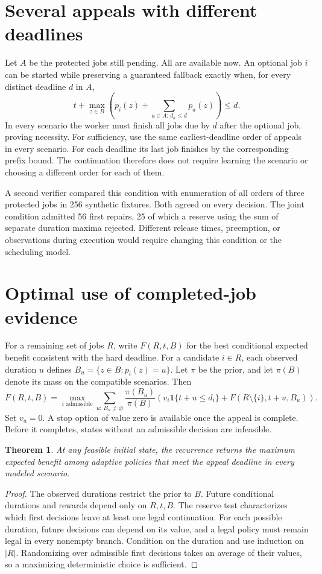 \documentclass[11pt]{article}
\newtheorem{theorem}{Theorem}
\begin{document}
\section{Several appeals with different deadlines}
Let $A$ be the protected jobs still pending. All are available now.
An optional job $i$ can be started while preserving a guaranteed
fallback exactly when, for every distinct deadline $d$ in $A$,
\[
 t+\max_{z\in B}\left(p_i(z)+
           \sum_{a\in A:\,d_a\le d} p_a(z)\right)\le d.
\]
In every scenario the worker must finish all jobs due by $d$ after
the optional job, proving necessity. For sufficiency, use the
same earliest-deadline order of appeals in every scenario. For
each deadline its last job finishes by the corresponding prefix
bound. The continuation therefore does not require learning the
scenario or choosing a different order for each of them.

A second verifier compared this condition with enumeration of
all orders of three protected jobs in 256 synthetic fixtures.
Both agreed on every decision. The joint condition admitted
56 first repairs, 25 of which a reserve using the sum of separate
duration maxima rejected. Different release times, preemption,
or observations during execution would require changing this
condition or the scheduling model.

\section{Optimal use of completed-job evidence}
For a remaining set of jobs $R$, write $F(R,t,B)$ for the best
conditional expected benefit consistent with the hard deadline.
For a candidate $i\in R$, each observed duration $u$ defines
$B_u=\{z\in B:p_i(z)=u\}$. Let $\pi$ be the prior, and let
$\pi(B)$ denote its mass on the compatible scenarios. Then
\[
F(R,t,B)=\max_{i\text{ admissible}}\sum_{u:\,B_u\ne\varnothing}
  \frac{\pi(B_u)}{\pi(B)}
  \left(v_i\mathbf{1}\{t+u\le d_i\}
        +F(R\setminus\{i\},t+u,B_u)\right).
\]
Set $v_a=0$. A stop option of value zero is available once the
appeal is complete. Before it completes, states without an
admissible decision are infeasible.

\begin{theorem}
At any feasible initial state, the recurrence returns the maximum
expected benefit among adaptive policies that meet the appeal
deadline in every modeled scenario.
\end{theorem}
\begin{proof}
The observed durations restrict the prior to $B$. Future
conditional durations and rewards depend only on $R,t,B$.
The reserve test characterizes which first decisions leave at
least one legal continuation. For each possible duration, future
decisions can depend on its value, and a legal policy must remain
legal in every nonempty branch. Condition on the duration and
use induction on $|R|$. Randomizing over admissible first decisions
takes an average of their values, so a maximizing deterministic
choice is sufficient.
\end{proof}
\end{document}
